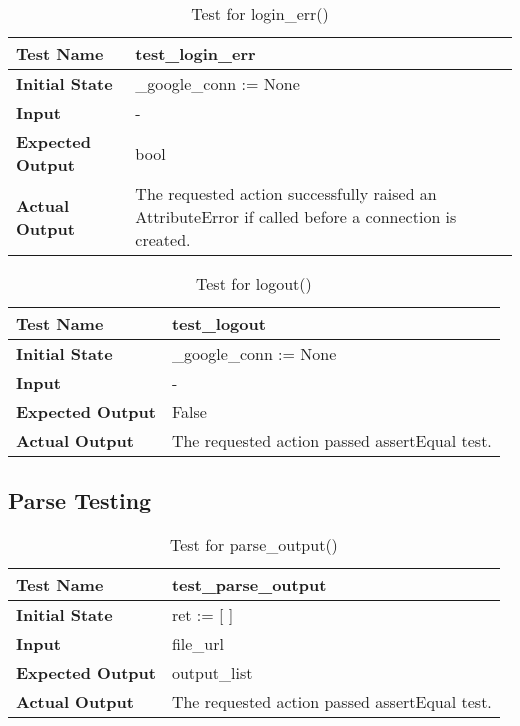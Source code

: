 \documentclass[12pt, titlepage]{article}
\begin{document}
		\begin{table}[!htbp]			
			\begin{tabularx}{\textwidth}{|l|X|}
				\hline
				\textbf{Test Name} & test\_login\_err
				\\ 
				\hline
				\textbf{Initial State} & \_google\_conn := None \\ 
				\hline
				\textbf{Input} & -  \\ 
				\hline 
				\textbf{Expected Output} & bool \\ 
				\hline				
				\textbf{Actual Output} & The requested action successfully raised an AttributeError if called before a connection is created.  \\				
				\hline
			\end{tabularx}
			\caption{Test for login\_err()}
			\label{Table}
		\end{table}

		\begin{table}[!htbp]			
			\begin{tabularx}{\textwidth}{|l|X|}
				\hline
				\textbf{Test Name} & test\_logout
				\\ 
				\hline
				\textbf{Initial State} & \_google\_conn := None \\ 
				\hline
				\textbf{Input} & -  \\ 
				\hline 
				\textbf{Expected Output} & False \\ 
				\hline				
				\textbf{Actual Output} & The requested action passed assertEqual test. \\				
				\hline
			\end{tabularx}
			\caption{Test for logout()}
			\label{Table}
		\end{table}
		
\FloatBarrier       %
    \subsection{Parse Testing}
    
    	\begin{table}[!htbp]
    	
			\begin{tabularx}{\textwidth}{|l|X|}
			
    			\hline
    			\textbf{Test Name} & test\_parse\_output\\ 
    			\hline
    			\textbf{Initial State} & ret := [ ] \\ 
    			\hline
    			\textbf{Input} & file\_url  \\ 
    			\hline 
    			\textbf{Expected Output} & output\_list \\
    			\hline 				
    			\textbf{Actual Output} & The requested action passed assertEqual test. \\		
    			\hline
    			
			\end{tabularx}
    		\caption{Test for parse\_output()}
    		\label{Table}
    	\end{table}
\FloatBarrier       %
\end{document}
